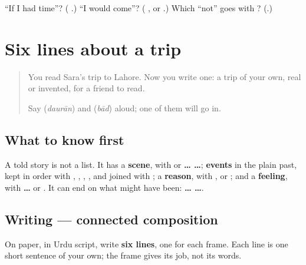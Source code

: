 \begin{tcolorbox}[breakable,colback=teal!4,colframe=teal!35!black,title={Before you move on}]
\textquotedblleft{}If I had time\textquotedblright{}? (\textbf{  }.) \textquotedblleft{}I would come\textquotedblright{}? (\textbf{ }, or \textbf{}.) Which \textquotedblleft{}not\textquotedblright{} goes with \textbf{}? (\textbf{}.)
\end{tcolorbox}
\section[(six lines)]{Six lines about a trip}

\label{lesson:UR-W275-six-lines}



\begin{quote}
You read Sara's trip to Lahore. Now you write one: a trip of your own, real or invented, for a friend to read.

Say \textbf{} (\emph{daurān}) and \textbf{} (\emph{bād}) aloud; one of them will go in.
\end{quote}

\subsection*{What to know first}
A told story is not a list. It has a \textbf{scene}, with \textbf{ } or \textbf{ …  …}; \textbf{events} in the plain past, kept in order with \textbf{}, \textbf{}, \textbf{  }, \textbf{ }, and joined with \textbf{}; a \textbf{reason}, with \textbf{}, \textbf{ } or \textbf{  }; and a \textbf{feeling}, with \textbf{ … } or \textbf{  }. It can end on what might have been: \textbf{ …   …}.

\subsection*{Writing — connected composition}
On paper, in Urdu script, write \textbf{six lines}, one for each frame. Each line is one short sentence of your own; the frame gives its job, not its words.

